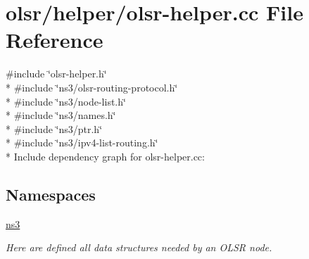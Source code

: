 \hypertarget{olsr-helper_8cc}{}\section{olsr/helper/olsr-\/helper.cc File Reference}
\label{olsr-helper_8cc}
{\ttfamily \#include \char`\"{}olsr-\/helper.\+h\char`\"{}}\\*
{\ttfamily \#include \char`\"{}ns3/olsr-\/routing-\/protocol.\+h\char`\"{}}\\*
{\ttfamily \#include \char`\"{}ns3/node-\/list.\+h\char`\"{}}\\*
{\ttfamily \#include \char`\"{}ns3/names.\+h\char`\"{}}\\*
{\ttfamily \#include \char`\"{}ns3/ptr.\+h\char`\"{}}\\*
{\ttfamily \#include \char`\"{}ns3/ipv4-\/list-\/routing.\+h\char`\"{}}\\*
Include dependency graph for olsr-\/helper.cc\+:
\subsection*{Namespaces}
\begin{DoxyCompactItemize}
\item 
 \hyperlink{namespacens3}{ns3}
\begin{DoxyCompactList}\small\item\em Here are defined all data structures needed by an O\+L\+SR node. \end{DoxyCompactList}\end{DoxyCompactItemize}
